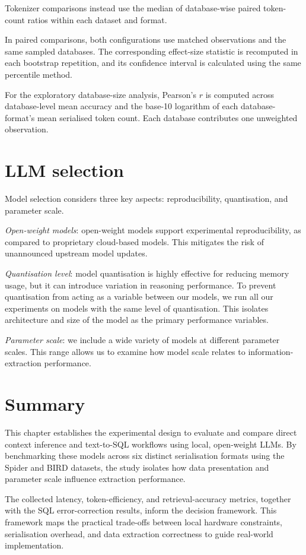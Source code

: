 Tokenizer comparisons instead use the median of database-wise paired token-count ratios within each dataset and format.

In paired comparisons, both configurations use matched observations and the same sampled databases. The
corresponding effect-size statistic is recomputed in each bootstrap repetition, and its confidence interval
is calculated using the same percentile method.

For the exploratory database-size analysis, Pearson's $r$ is computed across database-level mean accuracy and
the base-\num{10} logarithm of each database-format's mean serialised token count. Each database contributes
one unweighted observation.

\section{LLM selection}

Model selection considers three key aspects: reproducibility, quantisation, and parameter scale.

\emph{Open-weight models}: open-weight models support experimental reproducibility, as compared to
proprietary cloud-based
models. This mitigates the risk of unannounced upstream model updates.

\emph{Quantisation level}: model quantisation is highly effective for reducing memory usage, but it can
introduce variation in reasoning performance. To prevent quantisation from acting as a variable between our
models, we run all our experiments on models with the same level of quantisation. This isolates architecture
and size of the model as the primary performance variables.

\emph{Parameter scale}: we include a wide variety of models at different parameter scales. This range allows
us to examine how model scale relates to information-extraction performance.

\section{Summary}

This chapter establishes the experimental design to evaluate and compare direct context inference and
text-to-SQL workflows using local, open-weight LLMs. By benchmarking these models across six distinct
serialisation formats using the Spider and BIRD datasets, the study isolates how data presentation and
parameter scale influence extraction performance.

The collected latency, token-efficiency, and retrieval-accuracy metrics, together with the SQL
error-correction results, inform the decision framework. This framework maps the practical trade-offs between
local hardware constraints, serialisation overhead, and data extraction correctness to guide real-world implementation.
